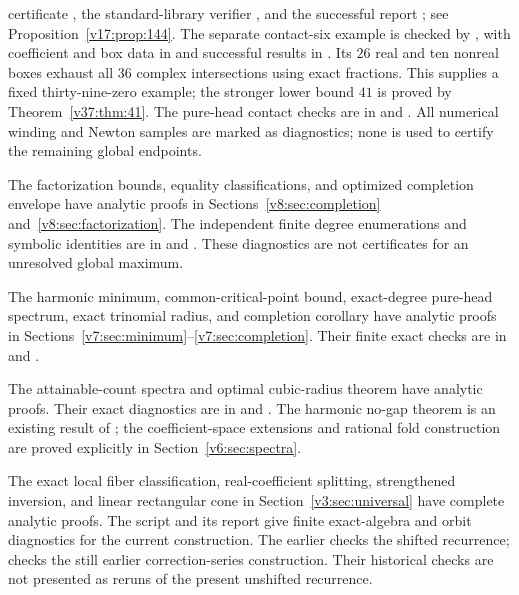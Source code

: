 \documentclass[UTF8,11pt]{ctexart}
\theoremstyle{definition}
\numberwithin{equation}{section}
\begin{document}
certificate , the standard-library
verifier , and the successful report
; see
Proposition~\ref{v17:prop:144}.
The separate contact-six example is checked by
, with coefficient and box data in
 and successful results in
. Its $26$ real and ten
nonreal boxes exhaust all $36$ complex intersections using exact
fractions. This supplies a fixed thirty-nine-zero example; the stronger
lower bound $41$ is proved by Theorem~\ref{v37:thm:41}.
The pure-head contact checks are in
 and
.
All numerical winding and Newton samples are marked as diagnostics;
none is used to certify the remaining global endpoints.\par\endgroup




The factorization bounds, equality classifications, and optimized
completion envelope have analytic proofs in
Sections~\ref{v8:sec:completion} and~\ref{v8:sec:factorization}.
The independent finite degree enumerations and symbolic identities are in
 and
.
These diagnostics are not certificates for an unresolved global maximum.


The harmonic minimum, common-critical-point bound, exact-degree pure-head
spectrum, exact trinomial
radius, and completion corollary have analytic proofs in
Sections~\ref{v7:sec:minimum}--\ref{v7:sec:completion}. Their finite
exact checks are in  and
.

The attainable-count spectra and optimal cubic-radius theorem have
analytic proofs. Their exact diagnostics are in
 and
.
The harmonic no-gap theorem is an existing result of \cite{SZ21};
the coefficient-space extensions and rational fold construction are
proved explicitly in Section~\ref{v6:sec:spectra}.

The exact local fiber classification, real-coefficient splitting,
strengthened inversion, and linear rectangular cone in
Section~\ref{v3:sec:universal} have complete analytic proofs.
The script  and its report
 give finite exact-algebra
and orbit diagnostics for the current construction.
The earlier  checks the shifted
recurrence;  checks the still earlier
correction-series construction. Their historical checks are not
presented as reruns of the present unshifted recurrence.
\end{document}
